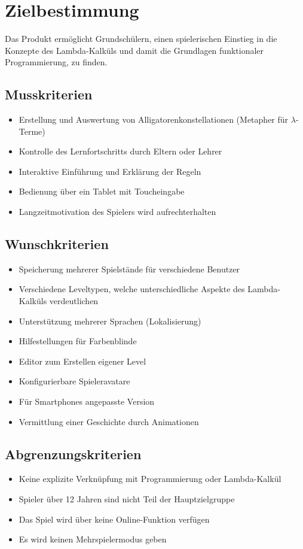 \section{Zielbestimmung}
Das Produkt ermöglicht Grundschülern, einen spielerischen Einstieg in die Konzepte des Lambda-Kalküls und damit die Grundlagen funktionaler Programmierung, zu finden.

\subsection{Musskriterien}

\begin{itemize}
	\item Erstellung und Auswertung von Alligatorenkonstellationen (Metapher für \(\lambda\)-Terme)
	\item Kontrolle des Lernfortschritts durch Eltern oder Lehrer
	\item Interaktive Einführung und Erklärung der Regeln
	\item Bedienung über ein Tablet mit Toucheingabe
	\item Langzeitmotivation des Spielers wird aufrechterhalten
\end{itemize}


\subsection{Wunschkriterien}

\begin{itemize}
	\item Speicherung mehrerer Spielstände für verschiedene Benutzer
	\item Verschiedene Leveltypen, welche unterschiedliche Aspekte des Lambda-Kalküls verdeutlichen
	\item Unterstützung mehrerer Sprachen (Lokalisierung)
	\item Hilfestellungen für Farbenblinde
	\item Editor zum Erstellen eigener Level
	\item Konfigurierbare Spieleravatare
	\item Für Smartphones angepasste Version
	\item Vermittlung einer Geschichte durch Animationen
\end{itemize}


\subsection{Abgrenzungskriterien}

\begin{itemize}
	\item Keine explizite Verknüpfung mit Programmierung oder Lambda-Kalkül
	\item Spieler über 12 Jahren sind nicht Teil der Hauptzielgruppe
	\item Das Spiel wird über keine Online-Funktion verfügen
	\item Es wird keinen Mehrspielermodus geben
\end{itemize}
